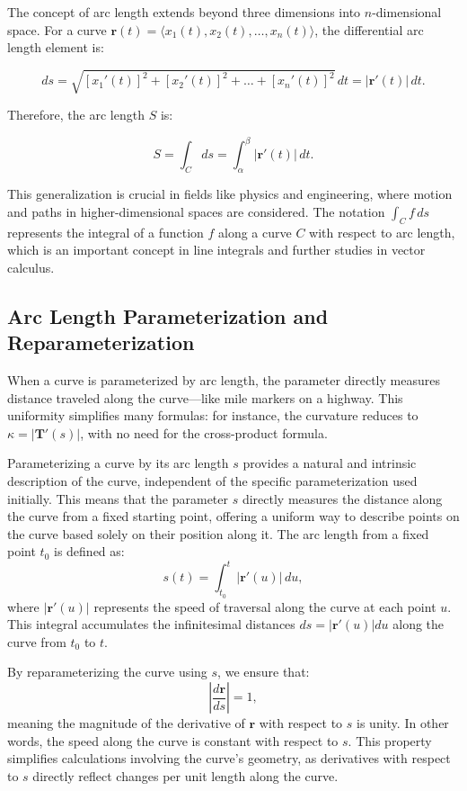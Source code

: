 \noindent The concept of arc length extends beyond three dimensions into \( n \)-dimensional space. For a curve \( \mathbf{r}(t) = \langle x_1(t), x_2(t), \dots, x_n(t) \rangle \), the differential arc length element is:

\[
ds = \sqrt{ [x_1'(t)]^2 + [x_2'(t)]^2 + \dots + [x_n'(t)]^2 } \, dt = \left| \mathbf{r}'(t) \right| \, dt.
\]

\noindent Therefore, the arc length \( S \) is:

\[
S = \int_{C} ds = \int_{\alpha}^{\beta} \left| \mathbf{r}'(t) \right| \, dt.
\]

\noindent This generalization is crucial in fields like physics and engineering, where motion and paths in higher-dimensional spaces are considered. The notation \( \int_{C} f \, ds \) represents the integral of a function \( f \) along a curve \( C \) with respect to arc length, which is an important concept in line integrals and further studies in vector calculus.

\subsection*{Arc Length Parameterization and Reparameterization}

\noindent When a curve is parameterized by arc length, the parameter directly measures distance traveled along the curve---like mile markers on a highway. This uniformity simplifies many formulas: for instance, the curvature reduces to \( \kappa = |\mathbf{T}'(s)| \), with no need for the cross-product formula.

\noindent Parameterizing a curve by its arc length \( s \) provides a natural and intrinsic description of the curve, independent of the specific parameterization used initially. This means that the parameter \( s \) directly measures the distance along the curve from a fixed starting point, offering a uniform way to describe points on the curve based solely on their position along it. The arc length from a fixed point \( t_0 \) is defined as:
\[
s(t) = \int_{t_0}^{t} \left| \mathbf{r}'(u) \right| \, du,
\]
where \( \left| \mathbf{r}'(u) \right| \) represents the speed of traversal along the curve at each point \( u \). This integral accumulates the infinitesimal distances \( ds = \left| \mathbf{r}'(u) \right| du \) along the curve from \( t_0 \) to \( t \).

\noindent By reparameterizing the curve using \( s \), we ensure that:
\[
\left| \dfrac{d\mathbf{r}}{ds} \right| = 1,
\]
meaning the magnitude of the derivative of \( \mathbf{r} \) with respect to \( s \) is unity. In other words, the speed along the curve is constant with respect to \( s \). This property simplifies calculations involving the curve's geometry, as derivatives with respect to \( s \) directly reflect changes per unit length along the curve.


